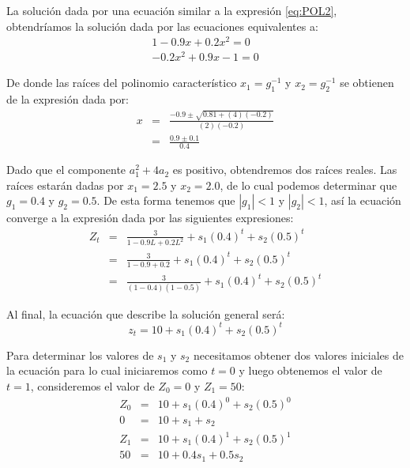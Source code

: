 \documentclass[
]{book}
\begin{document}
La solución dada por una ecuación similar a la expresión \eqref{eq:POL2}, obtendríamos la solución dada por las ecuaciones equivalentes a:
\begin{eqnarray}
    1 - 0.9 x + 0.2 x^2 = 0 \nonumber \\
    - 0.2 x^2 + 0.9 x - 1 = 0 \nonumber
\end{eqnarray}

De donde las raíces del polinomio característico \(x_1 = g_1^{-1}\) y \(x_2 = g_2^{-1}\) se obtienen de la expresión dada por:
\begin{eqnarray}
    x & = &\frac{-0.9 \pm \sqrt{0.81 + (4)(-0.2)}}{(2)(-0.2)} \nonumber \\
    & = & \frac{0.9 \pm 0.1}{0.4} \nonumber
\end{eqnarray}

Dado que el componente \(a^2_1 + 4 a_2\) es positivo, obtendremos dos raíces reales. Las raíces estarán dadas por \(x_1 = 2.5\) y \(x_2 = 2.0\), de lo cual podemos determinar que \(g_1 = 0.4\) y \(g_2 = 0.5\). De esta forma tenemos que \(|g_1| < 1\) y \(|g_2| < 1\), así la ecuación converge a la expresión dada por las siguientes expresiones:
\begin{eqnarray}
    Z_t & = & \frac{3}{1 - 0.9 L + 0.2 L^2} + s_1 (0.4)^t + s_2 (0.5)^t \nonumber \\
    & = & \frac{3}{1 - 0.9 + 0.2} + s_1 (0.4)^t + s_2 (0.5)^t \nonumber \\
    & = & \frac{3}{(1 - 0.4)(1 - 0.5)} + s_1 (0.4)^t + s_2 (0.5)^t \nonumber
\end{eqnarray}

Al final, la ecuación que describe la solución general será:
\begin{equation}
    z_t = 10 + s_1 (0.4)^t + s_2 (0.5)^t
    \label{eq:Conver9}
\end{equation}

Para determinar los valores de \(s_1\) y \(s_2\) necesitamos obtener dos valores iniciales de la ecuación para lo cual iniciaremos como \(t = 0\) y luego obtenemos el valor de \(t = 1\), consideremos el valor de \(Z_0 = 0\) y \(Z_1 = 50\):
\begin{eqnarray*}
    Z_0 & = & 10 + s_1(0.4)^0  + s_2(0.5)^0 \\
    0 & = & 10 + s_1 + s_2 \\
    Z_1 & = & 10 + s_1(0.4)^1  + s_2(0.5)^1 \\
    50 & = & 10 + 0.4 s_1 + 0.5 s_2
\end{eqnarray*}
\end{document}
